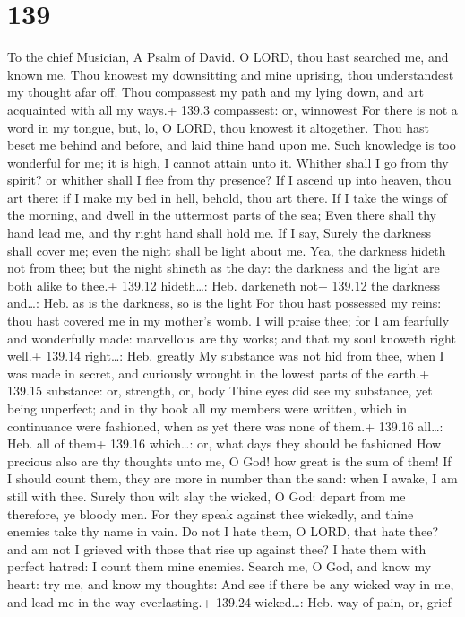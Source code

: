 \hypertarget{section-139}{%
\section{139}\label{section-139}}

To the chief Musician, A Psalm of David.  O LORD, thou hast
searched me, and known me.  Thou knowest my downsitting and
mine uprising, thou understandest my thought afar off.  Thou
compassest my path and my lying down, and art acquainted with all my
ways.+ 139.3 compassest: or, winnowest  For there is not a
word in my tongue, but, lo, O LORD, thou knowest it altogether.
 Thou hast beset me behind and before, and laid thine hand
upon me.  Such knowledge is too wonderful for me; it is
high, I cannot attain unto it.  Whither shall I go from thy
spirit? or whither shall I flee from thy presence?  If I
ascend up into heaven, thou art there: if I make my bed in hell, behold,
thou art there.  If I take the wings of the morning, and
dwell in the uttermost parts of the sea;  Even there shall
thy hand lead me, and thy right hand shall hold me.  If I
say, Surely the darkness shall cover me; even the night shall be light
about me.  Yea, the darkness hideth not from thee; but the
night shineth as the day: the darkness and the light are both alike to
thee.+ 139.12 hideth\ldots: Heb. darkeneth not+ 139.12 the darkness
and\ldots: Heb. as is the darkness, so is the light  For
thou hast possessed my reins: thou hast covered me in my mother's womb.
 I will praise thee; for I am fearfully and wonderfully
made: marvellous are thy works; and that my soul knoweth right well.+
139.14 right\ldots: Heb. greatly  My substance was not hid
from thee, when I was made in secret, and curiously wrought in the
lowest parts of the earth.+ 139.15 substance: or, strength, or, body
 Thine eyes did see my substance, yet being unperfect; and
in thy book all my members were written, which in continuance were
fashioned, when as yet there was none of them.+ 139.16 all\ldots: Heb.
all of them+ 139.16 which\ldots: or, what days they should be fashioned
 How precious also are thy thoughts unto me, O God! how
great is the sum of them!  If I should count them, they are
more in number than the sand: when I awake, I am still with thee.
 Surely thou wilt slay the wicked, O God: depart from me
therefore, ye bloody men.  For they speak against thee
wickedly, and thine enemies take thy name in vain.  Do not
I hate them, O LORD, that hate thee? and am not I grieved with those
that rise up against thee?  I hate them with perfect
hatred: I count them mine enemies.  Search me, O God, and
know my heart: try me, and know my thoughts:  And see if
there be any wicked way in me, and lead me in the way everlasting.+
139.24 wicked\ldots: Heb. way of pain, or, grief

